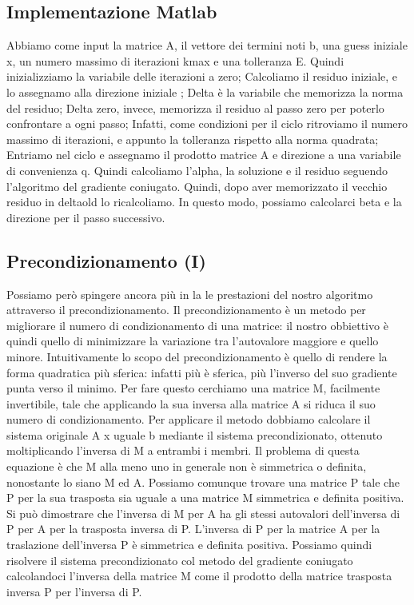 \documentclass[a4paper]{article}
\begin{document}
\subsection*{Implementazione Matlab}
Abbiamo come input la matrice A, il vettore dei termini noti b, una guess iniziale x, un numero massimo di iterazioni kmax e una tolleranza E.
Quindi inizializziamo la variabile delle iterazioni a zero;
Calcoliamo il residuo iniziale, e lo assegnamo alla direzione iniziale ;
Delta è la variabile che memorizza la norma del residuo;
Delta zero, invece, memorizza il residuo al passo zero per poterlo confrontare a ogni passo;
Infatti, come condizioni per il ciclo ritroviamo il numero massimo di iterazioni, e appunto la tolleranza rispetto alla norma quadrata;
Entriamo nel ciclo e assegnamo il prodotto matrice A e direzione a una variabile di convenienza q.
Quindi calcoliamo l’alpha, la soluzione e il residuo seguendo l’algoritmo del gradiente coniugato.
Quindi, dopo aver memorizzato il vecchio residuo in deltaold lo ricalcoliamo.
In questo modo, possiamo calcolarci beta e la direzione per il passo successivo.

\subsection*{Precondizionamento (I)}
Possiamo però spingere ancora più in la le prestazioni del nostro algoritmo attraverso il precondizionamento.
Il precondizionamento è un metodo per migliorare  il numero di condizionamento di una matrice: il nostro obbiettivo è quindi quello di  minimizzare la variazione tra l’autovalore maggiore e quello minore.
Intuitivamente lo scopo del precondizionamento è quello di rendere la forma quadratica più sferica: infatti più è sferica, più l’inverso del suo gradiente punta verso il minimo.
Per fare questo cerchiamo una matrice M, facilmente invertibile, tale che applicando la sua inversa alla matrice A si riduca il suo numero di condizionamento.
Per applicare il metodo dobbiamo calcolare il sistema originale A x uguale b mediante il sistema precondizionato, ottenuto moltiplicando l’inversa di M a entrambi i membri.
Il problema di questa equazione è che M alla meno uno in generale non è simmetrica o definita, nonostante lo siano M ed A.
Possiamo comunque trovare una matrice P tale che P per la sua trasposta sia uguale a una matrice M simmetrica e definita positiva.
Si può dimostrare che l’inversa di M per A ha gli stessi autovalori dell’inversa di P per A per la trasposta inversa di P.
L’inversa di P per la matrice A per la traslazione dell’inversa P è simmetrica e definita positiva. Possiamo quindi risolvere il sistema precondizionato col metodo del gradiente coniugato calcolandoci l’inversa della matrice M come il prodotto della matrice trasposta inversa P per l’inversa di P.
\end{document}
